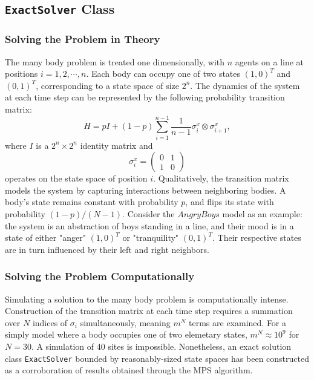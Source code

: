 \documentclass[english]{article}[12pt]
\begin{document}
\subsection{\texttt{ExactSolver} Class}

\subsubsection{Solving the Problem in Theory}
	The many body problem is treated one dimensionally, with $n$ agents on a line at positions $i=1,2,\cdots,n$. Each body can occupy one of two states $(1,0)^T$ and $(0,1)^T$, corresponding to a state space of size $2^n$. The dynamics of the system at each time step can be represented by the following probability transition matrix:
\begin{displaymath}
H = pI + (1-p)\sum_{i=1}^{n-1}\frac{1}{n-1}\sigma_i^x\otimes\sigma_{i+1}^x,
\end{displaymath}
where $I$ is a $2^n\times2^n$ identity matrix and
\begin{displaymath}
\sigma_i^x =
\begin{pmatrix}
0 & 1 \\
1 & 0
\end{pmatrix}
\end{displaymath}
operates on the state space of position $i$.  Qualitatively, the transition matrix models the system by capturing interactions between neighboring bodies. A body's state remains constant with probability $p$, and flips its state with probability  $(1-p)/(N-1)$. Consider the $Angry Boys$ model as an example: the system is an abstraction of boys standing in a line, and their mood is in a state of either  "anger" $(1,0)^T$ or "tranquility" $(0,1)^T$. Their respective states are in turn influenced by their left and right neighbors.

\subsubsection{Solving the Problem Computationally}
	Simulating a solution to the many body problem is computationally intense. Construction of the transition matrix at each time step requires a summation over $N$ indices of $\sigma_{i}$
simultaneously, meaning $m^{N}$ terms are examined. For a simply model where a body occupies one of two elemetary states, $m^{N}\approx10^{9}$ for $N=30$. A simulation of $40$ sites is impossible.  Nonetheless, an exact solution class \texttt{ExactSolver} bounded by reasonably-sized state spaces has been constructed as a corroboration of results obtained through the MPS algorithm.
\end{document}

